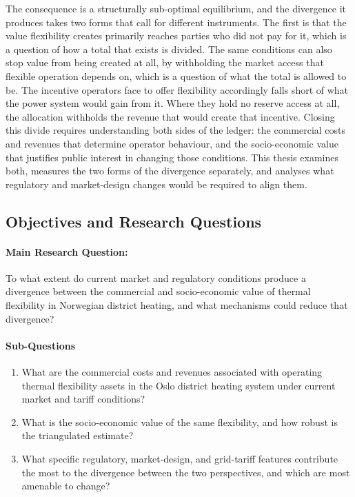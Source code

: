 The consequence is a structurally sub-optimal equilibrium, and the divergence it produces takes two forms that call for different instruments. The first is that the value flexibility creates primarily reaches parties who did not pay for it, which is a question of how a total that exists is divided. The same conditions can also stop value from being created at all, by withholding the market access that flexible operation depends on, which is a question of what the total is allowed to be. The incentive operators face to offer flexibility accordingly falls short of what the power system would gain from it. Where they hold no reserve access at all, the allocation withholds the revenue that would create that incentive. Closing this divide requires understanding both sides of the ledger: the commercial costs and revenues that determine operator behaviour, and the socio-economic value that justifies public interest in changing those conditions. This thesis examines both, measures the two forms of the divergence separately, and analyses what regulatory and market-design changes would be required to align them.


\subsection{Objectives and Research Questions}
\label{1-subsec:1.3 research questions}

\paragraph*{Main Research Question:} 
To what extent do current market and regulatory conditions produce a divergence between the commercial and socio-economic value of thermal flexibility in Norwegian district heating, and what mechanisms could reduce that divergence?

\paragraph*{Sub-Questions}
\begin{enumerate}
    \item What are the commercial costs and revenues associated with operating thermal flexibility assets in the Oslo district heating system under current market and tariff conditions?
    \item What is the socio-economic value of the same flexibility, and how robust is the triangulated estimate?
    \item What specific regulatory, market-design, and grid-tariff features contribute the most to the divergence between the two perspectives, and which are most amenable to change?
\end{enumerate}


